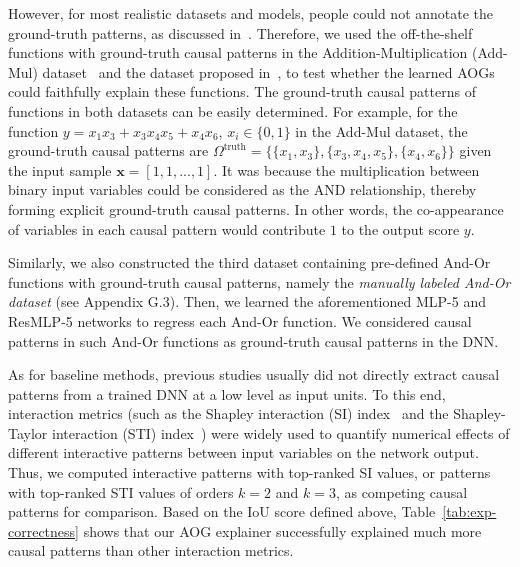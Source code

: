 \documentclass[10pt,twocolumn,letterpaper]{article}
\begin{document}
However, for most realistic datasets and models, people could not annotate the ground-truth patterns, as discussed in~\cite{zhang2021interpreting}.
Therefore, we used the off-the-shelf functions with ground-truth causal patterns in the Addition-Multiplication (Add-Mul) dataset~\cite{zhang2021interpreting} and the dataset proposed in~\cite{ren2021learning}, to test whether the learned AOGs could faithfully explain these functions. 
The ground-truth causal patterns of functions in both datasets can be easily determined.
For example, for the function {\small$y=x_1x_3+x_3x_4x_5+x_4x_6$, $x_i\in\{0,1\}$} in the Add-Mul dataset, the ground-truth causal patterns are {\small$\Omega^{\text{truth}}=\{\{x_1, x_3\}, \{x_3, x_4, x_5\}, \{x_4, x_6\}\}$} given the input sample {\small$\boldsymbol{x}\!=\![1, 1, ..., 1]$}. It was because the multiplication between binary input variables could be considered as the AND relationship, thereby forming explicit ground-truth causal patterns. In other words,
the co-appearance of variables in each causal pattern would contribute {\small$1$} to the output score {\small$y$}.


Similarly, we also constructed the third dataset containing pre-defined And-Or functions with ground-truth causal patterns, namely the \textit{manually labeled And-Or dataset} (see Appendix G.3).
Then, we learned the aforementioned MLP-5 and ResMLP-5 networks to regress each And-Or function.
We considered causal patterns in such And-Or functions as ground-truth causal patterns in the DNN.

As for baseline methods, previous studies usually did not directly extract causal patterns from a trained DNN at a low level as input units.
To this end, interaction metrics (such as the Shapley interaction (SI) index~\cite{grabisch1999axiomatic} and the Shapley-Taylor interaction (STI) index~\cite{sundararajan2020shapley}) were widely used to quantify numerical effects of different interactive patterns between input variables on the network output. Thus, we computed interactive patterns with top-ranked SI values, or patterns with top-ranked STI values of orders {\small$k\!=\!2$} and {\small$k\!=\!3$}, as competing causal patterns for comparison.
Based on the IoU score defined above, Table~\ref{tab:exp-correctness} shows that our AOG explainer successfully explained much more causal patterns than other interaction metrics.
\end{document}
